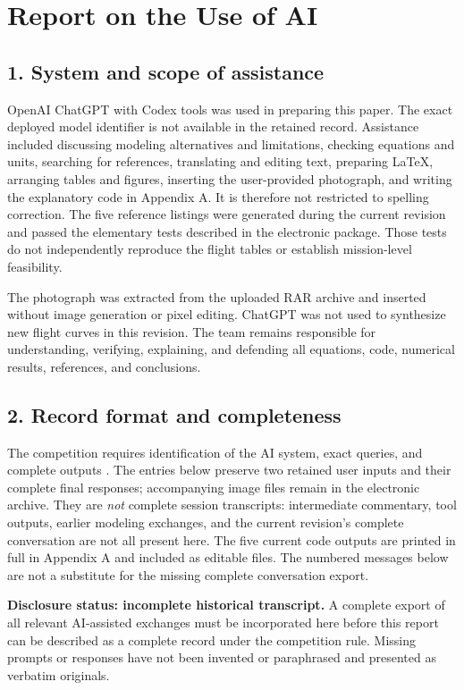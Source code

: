 \section*{Report on the Use of AI}
\subsection*{1. System and scope of assistance}
OpenAI ChatGPT with Codex tools was used in preparing this paper. The exact deployed model identifier is not available in the retained record. Assistance included discussing modeling alternatives and limitations, checking equations and units, searching for references, translating and editing text, preparing LaTeX, arranging tables and figures, inserting the user-provided photograph, and writing the explanatory code in Appendix A. It is therefore not restricted to spelling correction. The five reference listings were generated during the current revision and passed the elementary tests described in the electronic package. Those tests do not independently reproduce the flight tables or establish mission-level feasibility.

The photograph was extracted from the uploaded RAR archive and inserted without image generation or pixel editing. ChatGPT was not used to synthesize new flight curves in this revision. The team remains responsible for understanding, verifying, explaining, and defending all equations, code, numerical results, references, and conclusions.

\subsection*{2. Record format and completeness}
The competition requires identification of the AI system, exact queries, and complete outputs \cite{airules}. The entries below preserve two retained user inputs and their complete final responses; accompanying image files remain in the electronic archive. They are \emph{not} complete session transcripts: intermediate commentary, tool outputs, earlier modeling exchanges, and the current revision's complete conversation are not all present here. The five current code outputs are printed in full in Appendix A and included as editable files. The numbered messages below are not a substitute for the missing complete conversation export.

\textbf{Disclosure status: incomplete historical transcript.} A complete export of all relevant AI-assisted exchanges must be incorporated here before this report can be described as a complete record under the competition rule. Missing prompts or responses have not been invented or paraphrased and presented as verbatim originals.
